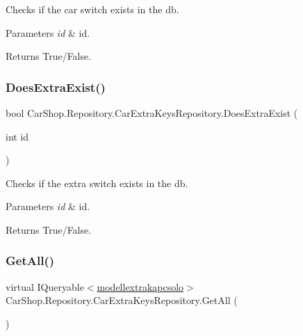 Checks if the car switch exists in the db. 


\begin{DoxyParams}{Parameters}
{\em id} & id.\\
\hline
\end{DoxyParams}
\begin{DoxyReturn}{Returns}
True/\+False.
\end{DoxyReturn}
\mbox{\label{class_car_shop_1_1_repository_1_1_car_extra_keys_repository_a0b75f82c4df05804e0f217cb43d342c2}} 
\subsubsection{\texorpdfstring{Does\+Extra\+Exist()}{DoesExtraExist()}}
{\footnotesize\ttfamily bool Car\+Shop.\+Repository.\+Car\+Extra\+Keys\+Repository.\+Does\+Extra\+Exist (\begin{DoxyParamCaption}\item[{int}]{id }\end{DoxyParamCaption})}



Checks if the extra switch exists in the db. 


\begin{DoxyParams}{Parameters}
{\em id} & id.\\
\hline
\end{DoxyParams}
\begin{DoxyReturn}{Returns}
True/\+False.
\end{DoxyReturn}
\mbox{\label{class_car_shop_1_1_repository_1_1_car_extra_keys_repository_ab2d1626c117c62d3126519c3fa700ab6}} 
\subsubsection{\texorpdfstring{Get\+All()}{GetAll()}}
{\footnotesize\ttfamily virtual I\+Queryable$<$\mbox{\hyperlink{class_car_shop_1_1_data_1_1modellextrakapcsolo}{modellextrakapcsolo}}$>$ Car\+Shop.\+Repository.\+Car\+Extra\+Keys\+Repository.\+Get\+All (\begin{DoxyParamCaption}{ }\end{DoxyParamCaption})\hspace{0.3cm}{\ttfamily [virtual]}}



